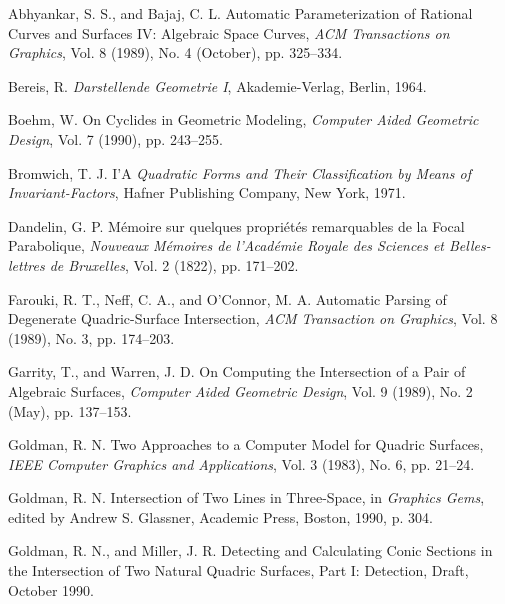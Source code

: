 \newpage
\begin{thebibliography}{999}

     Abhyankar, S. S., and Bajaj, C. L.
     Automatic Parameterization of Rational Curves and Surfaces IV:
          Algebraic Space Curves,
     {\em ACM Transactions on Graphics},
     Vol. 8 (1989), No. 4 (October), pp. 325--334.

     Bereis, R.
     {\em Darstellende Geometrie I},
     Akademie-Verlag, Berlin, 1964.

     Boehm, W.
     On Cyclides in Geometric Modeling,
     {\em Computer Aided Geometric Design},
     Vol. 7 (1990), pp. 243--255.

     Bromwich, T. J. I'A
     {\em Quadratic Forms and Their Classification
          by Means of Invariant-Factors},
     Hafner Publishing Company, New York, 1971.

     Dandelin, G. P.
     M\'{e}moire sur quelques propri\'{e}t\'{e}s remarquables de la Focal
     Parabolique,
     {\em Nouveaux M\'{e}moires de l'Acad\'{e}mie Royale des Sciences et
     Belles-lettres de Bruxelles},
     Vol. 2 (1822), pp. 171--202.

     Farouki, R. T., Neff, C. A., and O'Connor, M. A.
     Automatic Parsing of Degenerate Quadric-Surface Intersection,
     {\em ACM Transaction on Graphics},
     Vol. 8 (1989), No. 3, pp. 174--203.

     Garrity, T., and Warren, J. D.
     On Computing the Intersection of a Pair of Algebraic Surfaces,
     {\em Computer Aided Geometric Design},
     Vol. 9 (1989), No. 2 (May), pp. 137--153.


     Goldman, R. N.
     Two Approaches to a Computer Model for Quadric Surfaces,
     {\em IEEE Computer Graphics and Applications},
     Vol. 3 (1983), No. 6, pp. 21--24.

     Goldman, R. N.
     Intersection of Two Lines in Three-Space,
     in {\em Graphics Gems}, edited by Andrew S. Glassner,
     Academic Press, Boston, 1990, p. 304.

     Goldman, R. N., and Miller, J. R.
     Detecting and Calculating Conic Sections in the Intersection of Two
     Natural Quadric Surfaces, Part I: Detection,
     Draft, October 1990.


\end{thebibliography}
